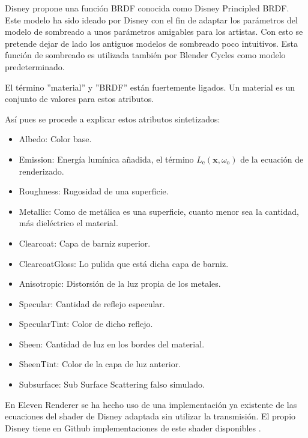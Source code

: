 Disney propone una función BRDF conocida como Disney Principled BRDF\cite{burley2012physically}. Este modelo ha sido ideado por Disney con el fin de adaptar los parámetros del modelo de sombreado a unos parámetros amigables para los artistas. Con esto se pretende dejar de lado los antiguos modelos de sombreado poco intuitivos. Esta función de sombreado es utilizada también por Blender Cycles como modelo predeterminado.
	
El término ''material'' y ''BRDF'' están fuertemente ligados. Un material es un conjunto de valores para estos atributos.
		
Así pues se procede a explicar estos atributos sintetizados:

\begin{itemize}

	\item Albedo: Color base.
	\item Emission: Energía lumínica añadida, el término $L_{\text{e}}(\mathbf {x} ,\omega _{\text{o}})$ de la ecuación de renderizado.
	\item Roughness: Rugosidad de una superficie.
	\item Metallic: Como de metálica es una superficie, cuanto menor sea la cantidad, más dieléctrico el material.
	\item Clearcoat: Capa de barniz superior.
	\item ClearcoatGloss: Lo pulida que está dicha capa de barniz.
	\item Anisotropic: Distorsión de la luz propia de los metales.
	\item Specular: Cantidad de reflejo especular.
	\item SpecularTint: Color de dicho reflejo.
	\item Sheen: Cantidad de luz en los bordes del material.
	\item SheenTint: Color de la capa de luz anterior.
	\item Subsurface: Sub Surface Scattering falso simulado.
	
\end{itemize}

En Eleven Renderer se ha hecho uso de una implementación ya existente \cite{knightcrawler25} de las ecuaciones del shader de Disney adaptada sin utilizar la transmisión. El propio Disney tiene en Github implementaciones de este shader disponibles \cite{disneyrepo}.
	
